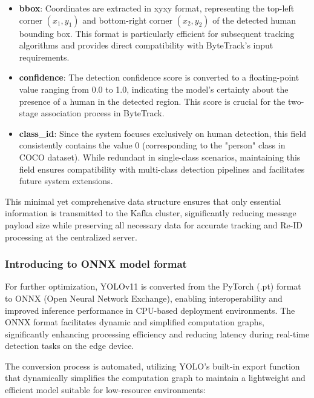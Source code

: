 \begin{itemize}
    \item \textbf{bbox}: Coordinates are extracted in xyxy format, representing the top-left corner $(x_1, y_1)$ and bottom-right corner $(x_2, y_2)$ of the detected human bounding box. This format is particularly efficient for subsequent tracking algorithms and provides direct compatibility with ByteTrack's input requirements.
    
    \item \textbf{confidence}: The detection confidence score is converted to a floating-point value ranging from 0.0 to 1.0, indicating the model's certainty about the presence of a human in the detected region. This score is crucial for the two-stage association process in ByteTrack.
    
    \item \textbf{class\_id}: Since the system focuses exclusively on human detection, this field consistently contains the value 0 (corresponding to the "person" class in COCO dataset). While redundant in single-class scenarios, maintaining this field ensures compatibility with multi-class detection pipelines and facilitates future system extensions.
\end{itemize}

This minimal yet comprehensive data structure ensures that only essential information is transmitted to the Kafka cluster, significantly reducing message payload size while preserving all necessary data for accurate tracking and Re-ID processing at the centralized server.



\subsubsection{Introducing to ONNX model format}

For further optimization, YOLOv11 is converted from the PyTorch (.pt) format to ONNX (Open Neural Network Exchange), enabling interoperability and improved inference performance in CPU-based deployment environments. The ONNX format facilitates dynamic and simplified computation graphs, significantly enhancing processing efficiency and reducing latency during real-time detection tasks on the edge device.

The conversion process is automated, utilizing YOLO's built-in export function that dynamically simplifies the computation graph to maintain a lightweight and efficient model suitable for low-resource environments:

